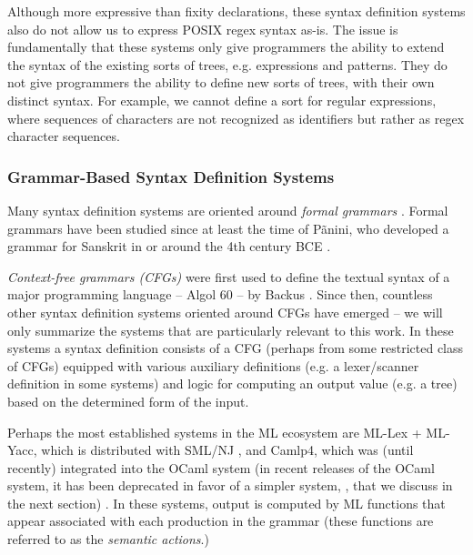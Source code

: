 Although more expressive than fixity declarations, these syntax definition systems also do not allow us to express POSIX regex syntax as-is. The issue is fundamentally that these systems only give programmers the ability to extend the syntax of the existing sorts of trees, e.g. expressions and patterns. They do not give programmers the ability to define new sorts of trees, with their own distinct syntax. For example, we cannot define a sort for regular expressions, where sequences of characters are not recognized as identifiers but rather as regex character sequences. 

\subsubsection{Grammar-Based Syntax Definition Systems}
Many syntax definition systems are oriented around \emph{formal grammars} \cite{hopcroft1979introduction}. Formal grammars have been studied since at least the time of P\~anini, who developed a grammar for Sanskrit in or around the 4th century BCE \cite{Ingerman:1967:LFS:363162.363165}. 

\emph{Context-free grammars (CFGs)} were first used to define the textual syntax of a major programming language -- Algol 60 -- by Backus \cite{naur1963revised}. Since then, countless other syntax definition systems oriented around CFGs have emerged -- we will only summarize the systems that are particularly relevant to this work. In these systems a syntax definition consists of a CFG (perhaps from some restricted class of CFGs) equipped with various auxiliary definitions (e.g. a lexer/scanner definition in some systems) and logic for computing an output value (e.g. a tree) based on the determined form of the input. 

Perhaps the most established systems in the ML ecosystem are ML-Lex + ML-Yacc, which is distributed with SML/NJ \cite{TarditiDR:mly}, and Camlp4, which was (until recently)  integrated into  the OCaml system (in recent releases of the OCaml system, it has been deprecated in favor of a simpler system, , that we discuss in the next section) \cite{ocaml-manual}. In these systems, output is  computed by ML functions that appear associated with each production in the grammar (these functions are referred to as the \emph{semantic actions}.) 

